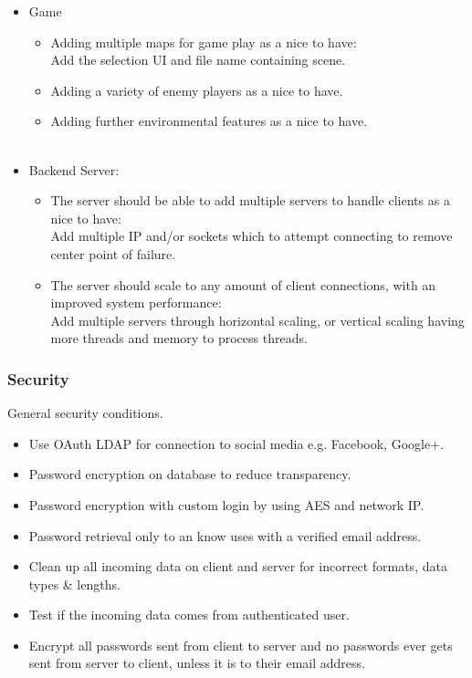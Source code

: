 \documentclass[letterpaper]{article}
\begin{document}
					\begin{itemize}
						\item Game
							\begin{itemize}
								\item Adding multiple maps for game play as a nice to have: \\
										Add the selection UI and file name containing scene.
								\item Adding a variety of enemy players as a nice to have.
								\item Adding further environmental features as a nice to have. \\ \\
							\end{itemize}
						\item Backend Server:
							\begin{itemize}
								\item The server should be able to add multiple servers to handle clients as a nice to have: \\
									Add multiple IP and/or sockets which to attempt connecting to remove center point of failure.
								\item The server should scale to any amount of client connections, with an improved system performance: \\
									Add multiple servers through horizontal scaling, or vertical scaling having more threads and memory to process threads.
							\end{itemize}
					\end{itemize}
				
				\subsubsection*{Security}
				\vspace{0.1in}
				
					General security conditions.
					\begin{itemize}
						\item Use OAuth LDAP for connection to social media e.g. Facebook, Google+.
						\item Password encryption on database to reduce transparency.
						\item Password encryption with custom login by using AES and network IP.
						\item Password retrieval only to an know uses with a verified email address.
						\item Clean up all incoming data on client and server for incorrect formats, data types \& lengths.
						\item Test if the incoming data comes from authenticated user.
						\item Encrypt all passwords sent from client to server and no passwords ever gets sent from server to client, unless it is to their email address.
					\end{itemize}
				
\end{document}
